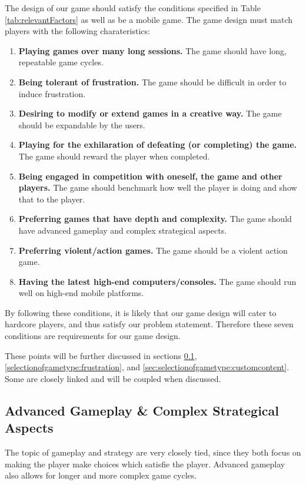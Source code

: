 The design of our game should satisfy the conditions specified in Table \ref{tab:relevantFactors} as well as be a mobile game.
The game design must match players with the following charateristics:
\begin{enumerate}\label{gamedesign:selectionofgametype:importantstuff}
\item \textbf{Playing games over many long sessions.} The game should have long, repeatable game cycles.
\item \textbf{Being tolerant of frustration.} The game should be difficult in order to induce frustration.
\item \textbf{Desiring to modify or extend games in a creative way.} The game should be expandable by the users.
\item \textbf{Playing for the exhilaration of defeating (or completing) the game.} The game should reward the player when completed.
\item \textbf{Being engaged in competition with oneself, the game and other players.} The game should benchmark how well the player is doing and show that to the player.
\item \textbf{Preferring games that have depth and complexity.} The game should have advanced gameplay and complex strategical aspects.
\item \textbf{Preferring violent/action games.} The game should be a violent action game.
\item \textbf{Having the latest high-end computers/consoles.} The game should run well on high-end mobile platforms.
\end{enumerate}
By following these conditions, it is likely that our game design will cater to hardcore players, and thus satisfy our problem statement. 
Therefore these seven conditions are requirements for our game design.

These points will be further discussed in sections \ref{selectionofgametype:advancedgameplay}, \ref{selectionofgametype:frustration}, and \ref{sec:selectionofgametype:customcontent}.
Some are closely linked and will be coupled when discussed.

\subsection{Advanced Gameplay \& Complex Strategical Aspects}\label{selectionofgametype:advancedgameplay}\label{sec:selectionofgametype:mobiledevices}
The topic of gameplay and strategy are very closely tied, since they both focus on making the player make choices which satisfie the player.
Advanced gameplay also allows for longer and more complex game cycles.

